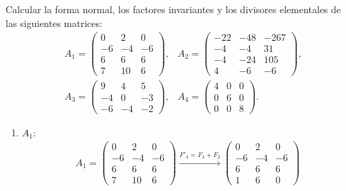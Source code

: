 \begin{ejercicio}\label{ej:7.7}
    Calcular la forma normal, los factores invariantes y los divisores elementales de las siguientes matrices:
    \begin{align*}
        &A_1 = \begin{pmatrix}
            0 & 2 & 0 \\
            -6 & -4 & -6 \\
            6 & 6 & 6 \\
            7 & 10 & 6
        \end{pmatrix},
        &A_2 = \begin{pmatrix}
            -22 & -48 & -267 \\
            -4 & -4 & 31 \\
            -4 & -24 & 105 \\
            4 & -6 & -6
        \end{pmatrix},\\
        &A_3 = \begin{pmatrix}
            9 & 4 & 5 \\
            -4 & 0 & -3 \\
            -6 & -4 & -2
        \end{pmatrix},
        &A_4 = \begin{pmatrix}
            4 & 0 & 0 \\
            0 & 6 & 0 \\
            0 & 0 & 8
        \end{pmatrix}.
    \end{align*}
    \begin{enumerate}
        \item $A_1$:
        \begin{multline*}
            A_1 = \begin{pmatrix}
                0 & 2 & 0 \\
                -6 & -4 & -6 \\
                6 & 6 & 6 \\
                7 & 10 & 6
            \end{pmatrix}
            \xrightarrow{F'_4=F_4+F_2}
            \begin{pmatrix}
                0 & 2 & 0 \\
                -6 & -4 & -6 \\
                6 & 6 & 6 \\
                1 & 6 & 0
            \end{pmatrix}

\end{multline*}
\end{enumerate}
\end{ejercicio}
